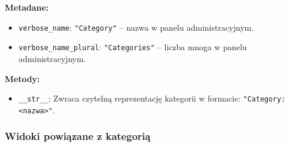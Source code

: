 \documentclass[12pt,a4paper,oneside]{article}
\theoremstyle{definition}
\numberwithin{equation}{section}
\begin{document}
\textbf{Metadane:}
\begin{itemize}
    \item \texttt{verbose\_name}: \texttt{"Category"} – nazwa w panelu administracyjnym.
    \item \texttt{verbose\_name\_plural}: \texttt{"Categories"} – liczba mnoga w panelu administracyjnym.
\end{itemize}

\textbf{Metody:}
\begin{itemize}
    \item \texttt{\_\_str\_\_}: Zwraca czytelną reprezentację kategorii w formacie: \texttt{"Category: <nazwa>"}.
\end{itemize}


\subsubsection*{Widoki powiązane z kategorią}
\end{document}
